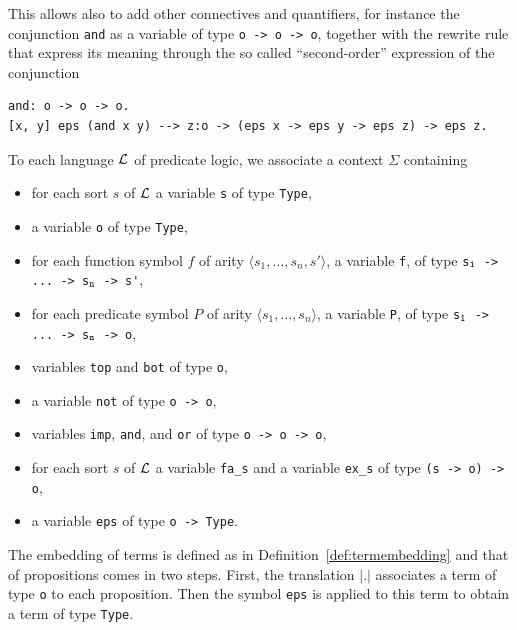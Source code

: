\documentclass[english]{lipics}
\newcommand\lst[1]{{\rm \lstinline{#1}}}
\begin{document}
This allows also to add other connectives and quantifiers, for instance the
conjunction \lst{and} as a variable of type \lst{o -> o -> o}, together
with the rewrite rule that express its meaning through the so called
``second-order'' expression of the conjunction
\begin{lstlisting}
and: o -> o -> o.
[x, y] eps (and x y) --> z:o -> (eps x -> eps y -> eps z) -> eps z.
\end{lstlisting}

\begin{definition}
\label{deflangembedding2}
To each language ${\cal L}$ of predicate logic, we associate a context
$\Sigma$ containing
\begin{itemize}
\item for each sort $s$ of ${\cal L}$ a variable \lst{s} of type \lst{Type},
\item a variable \lst{o} of type \lst{Type},
\item for each function symbol $f$ of arity $\langle s_1, \ldots, s_n,
s'\rangle$, a variable \lst{f}, of type
\lst{s}$_{\tt 1}$\lst{ -> ... -> s}$_{\tt n}$\lst{ -> s'},
\item for each predicate symbol $P$ of arity $\langle s_1, \ldots, s_n
\rangle$, a variable \lst{P}, of type
\lst{s}$_{\tt 1}$\lst{ -> ... -> s}$_{\tt n}$\lst{ -> o},
\item variables \lst{top} and \lst{bot} of type \lst{o},
\item a variable \lst{not} of type \lst{o -> o},
\item variables \lst{imp}, \lst{and}, and \lst{or} of type \lst{o -> o -> o},
\item for each sort $s$ of ${\cal L}$ a variable \lst{fa_s} and a
 variable \lst{ex_s} of type \lst{(s -> o) -> o},
\item a variable \lst{eps} of type \lst{o -> Type}.
\end{itemize}
\end{definition}

The embedding of terms is defined as in Definition~\ref{def:termembedding}
and that of propositions comes in two steps. First, the translation
$|.|$ associates a term of type \lst{o} to each proposition. Then the symbol
\lst{eps} is applied to this term to obtain a term of type \lst{Type}.
\end{document}
